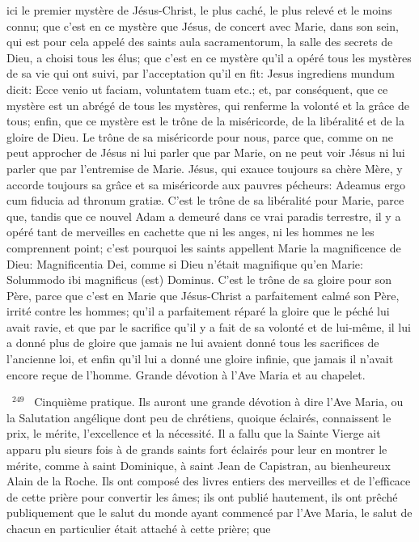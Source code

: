 \documentclass[paper=a5,pagesize=pdftex,fontsize=15pt,headinclude=on,twoside=off]{scrbook}
\newcommand{\negphantom}[1]{\settowidth{\dimen0}{#1}\hspace*{-\dimen0}}
\newcommand{\versenb}[1]{\par \vspace{10pt}~\negphantom{~${}^{#1}$~}${}^{#1}$~}
\begin{document}
ici le premier mystère de Jésus-Christ, le plus caché, le plus relevé et le moins connu; que c'est en ce mystère que
Jésus, de concert avec Marie, dans son sein, qui est pour cela appelé des saints aula sacramentorum, la salle des
secrets de Dieu, a choisi tous les élus; que c'est en ce mystère qu'il a opéré tous les mystères de sa vie qui ont
suivi, par l'acceptation qu'il en fit: Jesus ingrediens mundum dicit: Ecce venio ut faciam, voluntatem tuam etc.; et,
par conséquent, que ce mystère est un abrégé de tous les mystères, qui renferme la volonté et la grâce de tous;
enfin, que ce mystère est le trône de la miséricorde, de la libéralité et de la gloire de Dieu. Le trône de sa
miséricorde pour nous, parce que, comme on ne peut approcher de Jésus ni lui parler que par Marie, on ne peut
voir Jésus ni lui parler que par l'entremise de Marie. Jésus, qui exauce toujours sa chère Mère, y accorde toujours
sa grâce et sa miséricorde aux pauvres pécheurs: Adeamus ergo cum fiducia ad thronum gratiæ. C'est le trône de
sa libéralité pour Marie, parce que, tandis que ce nouvel Adam a demeuré dans ce vrai paradis terrestre, il y a
opéré tant de merveilles en cachette que ni les anges, ni les hommes ne les comprennent point; c'est pourquoi les
saints appellent Marie la magnificence de Dieu: Magnificentia Dei, comme si Dieu n'était magnifique qu'en Marie:
Solummodo ibi magnificus (est) Dominus. C'est le trône de sa gloire pour son Père, parce que c'est en Marie que
Jésus-Christ a parfaitement calmé son Père, irrité contre les hommes; qu'il a parfaitement réparé la gloire que le
péché lui avait ravie, et que par le sacrifice qu'il y a fait de sa volonté et de lui-même, il lui a donné plus de gloire
que jamais ne lui avaient donné tous les sacrifices de l'ancienne loi, et enfin qu'il lui a donné une gloire infinie, que
jamais il n'avait encore reçue de l'homme.
Grande dévotion à l'Ave Maria et au chapelet.
\versenb{249} Cinquième pratique. Ils auront une grande dévotion à dire l'Ave Maria, ou la Salutation angélique dont peu de
chrétiens, quoique éclairés, connaissent le prix, le mérite, l'excellence et la nécessité. Il a fallu que la Sainte Vierge
ait apparu plu sieurs fois à de grands saints fort éclairés pour leur en montrer le mérite, comme à saint Dominique,
à saint Jean de Capistran, au bienheureux Alain de la Roche. Ils ont composé des livres entiers des merveilles et
de l'efficace de cette prière pour convertir les âmes; ils ont publié hautement, ils ont prêché publiquement que le
salut du monde ayant commencé par l'Ave Maria, le salut de chacun en particulier était attaché à cette prière; que
\end{document}
